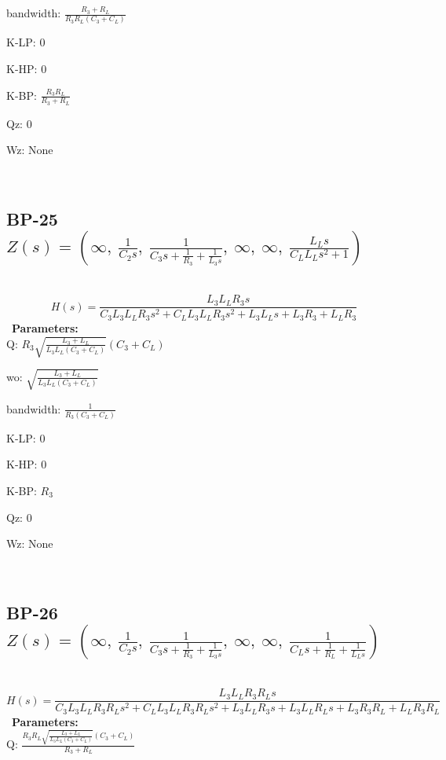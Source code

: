 \documentclass{article}
\begin{document}
bandwidth: $\frac{R_{3} + R_{L}}{R_{3} R_{L} \left(C_{3} + C_{L}\right)}$\ 

K-LP: $0$\ 

K-HP: $0$\ 

K-BP: $\frac{R_{3} R_{L}}{R_{3} + R_{L}}$\ 

Qz: $0$\ 

Wz: $\text{None}$\ 

\ 

\subsection{BP-25 $Z(s) = \left( \infty, \  \frac{1}{C_{2} s}, \  \frac{1}{C_{3} s + \frac{1}{R_{3}} + \frac{1}{L_{3} s}}, \  \infty, \  \infty, \  \frac{L_{L} s}{C_{L} L_{L} s^{2} + 1}\right)$ } \ 
\textbf{\[H(s) = \frac{L_{3} L_{L} R_{3} s}{C_{3} L_{3} L_{L} R_{3} s^{2} + C_{L} L_{3} L_{L} R_{3} s^{2} + L_{3} L_{L} s + L_{3} R_{3} + L_{L} R_{3}}\] } \ 
\textbf{Parameters:}\\ 

Q: $R_{3} \sqrt{\frac{L_{3} + L_{L}}{L_{3} L_{L} \left(C_{3} + C_{L}\right)}} \left(C_{3} + C_{L}\right)$\ 

wo: $\sqrt{\frac{L_{3} + L_{L}}{L_{3} L_{L} \left(C_{3} + C_{L}\right)}}$\ 

bandwidth: $\frac{1}{R_{3} \left(C_{3} + C_{L}\right)}$\ 

K-LP: $0$\ 

K-HP: $0$\ 

K-BP: $R_{3}$\ 

Qz: $0$\ 

Wz: $\text{None}$\ 

\ 

\subsection{BP-26 $Z(s) = \left( \infty, \  \frac{1}{C_{2} s}, \  \frac{1}{C_{3} s + \frac{1}{R_{3}} + \frac{1}{L_{3} s}}, \  \infty, \  \infty, \  \frac{1}{C_{L} s + \frac{1}{R_{L}} + \frac{1}{L_{L} s}}\right)$ } \ 
\textbf{\[H(s) = \frac{L_{3} L_{L} R_{3} R_{L} s}{C_{3} L_{3} L_{L} R_{3} R_{L} s^{2} + C_{L} L_{3} L_{L} R_{3} R_{L} s^{2} + L_{3} L_{L} R_{3} s + L_{3} L_{L} R_{L} s + L_{3} R_{3} R_{L} + L_{L} R_{3} R_{L}}\] } \ 
\textbf{Parameters:}\\ 

Q: $\frac{R_{3} R_{L} \sqrt{\frac{L_{3} + L_{L}}{L_{3} L_{L} \left(C_{3} + C_{L}\right)}} \left(C_{3} + C_{L}\right)}{R_{3} + R_{L}}$\ 
\end{document}
